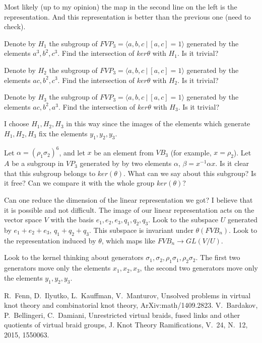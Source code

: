 \documentclass{article}
\begin{document}
Most likely (up to my opinion) the map in the second line on the left is the representation. And this representation is better than the previous one (need to check).

Denote by $H_1$ the subgroup of $FVP_3=\langle a,b,c~|~[a,c]=1\rangle$ generated by the elements $a^3,b^2,c^3$. Find the intersection of $ker{\theta}$ with $H_1$. Is it trivial?

Denote by $H_2$ the subgroup of $FVP_3=\langle a,b,c~|~[a,c]=1\rangle$ generated by the elements $ac,b^2,c^3$. Find the intersection of $ker{\theta}$ with $H_2$. Is it trivial?

Denote by $H_3$ the subgroup of $FVP_3=\langle a,b,c~|~[a,c]=1\rangle$ generated by the elements $ac,b^2,a^3$. Find the intersection of $ker{\theta}$ with $H_3$. Is it trivial?

I choose $H_1,H_2,H_3$ in this way since the images of the elements which generate $H_1,H_2,H_3$ fix the elements $y_1,y_2,y_3$. 

Let $\alpha=(\rho_1\sigma_2)^6$, and let $x$ be an element from $VB_3$ (for example, $x=\rho_2$). Let $A$ be a subgroup in $VP_3$ generated by by two elements $\alpha$, $\beta=x^{-1}\alpha x$. Is it clear that this subgroup belongs to $ker(\theta)$. What can we say about this subgroup? Is it free? Can we compare it with the whole group $ker(\theta)$?

Can one reduce the dimension of the linear representation we got? I believe that it is possible and not difficult. The image of our linear representation acts on the vector space $V$ with the basis $e_1,e_2,e_3,q_1,q_2,q_3$. Look to the subspace $U$ generated by $e_1+e_2+e_3$, $q_1+q_2+q_3$. This subspace is invariant under $\theta(FVB_n)$. Look to the representation induced by $\theta$, which maps like $FVB_n\to GL(V/U)$.

Look to the kernel thinking about generators $\sigma_1, \sigma_2, \rho_1\sigma_1,\rho_2\sigma_2$. The first two generators move only the elements $x_1,x_2,x_3$, the second two generators move only the elements $y_1,y_2,y_3$.

\begin{thebibliography}{00}
R.~Fenn, D.~Ilyutko, L.~Kauffman, V.~Manturov, Unsolved problems in virtual knot theory and combinatorial knot theory, ArXiv:math/1409.2823.
V.~Bardakov, P.~Bellingeri, C.~Damiani, Unrestricted virtual braids, fused links and other quotients of virtual braid groups, J. Knot Theory Ramifications, V.~24, N.~12, 2015, 1550063.
\end{thebibliography}
\end{document}
